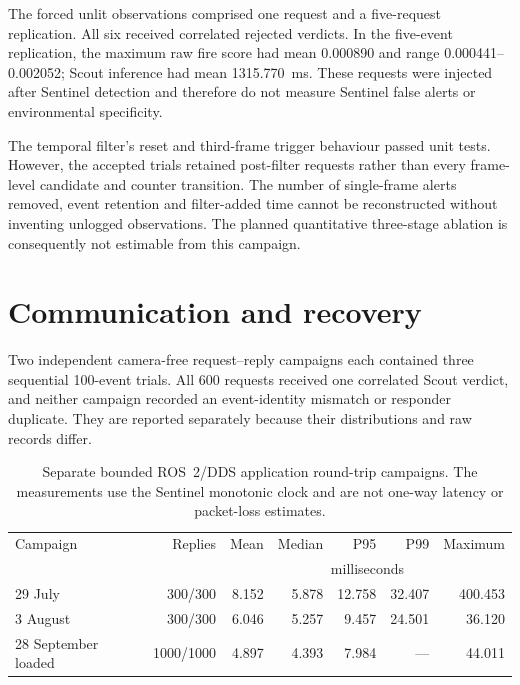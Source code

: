 The forced unlit observations comprised one request and a five-request
replication. All six received correlated rejected verdicts. In the five-event
replication, the maximum raw fire score had mean 0.000890 and range
0.000441--0.002052; Scout inference had mean 1315.770~ms. These requests were
injected after Sentinel detection and therefore do not measure Sentinel false
alerts or environmental specificity.

The temporal filter's reset and third-frame trigger behaviour passed unit
tests. However, the accepted trials retained post-filter requests rather than
every frame-level candidate and counter transition. The number of single-frame
alerts removed, event retention and filter-added time cannot be reconstructed
without inventing unlogged observations. The planned quantitative three-stage
ablation is consequently not estimable from this campaign.

\section{Communication and recovery}
\label{sec:results:5}

Two independent camera-free request--reply campaigns each contained three
sequential 100-event trials. All 600 requests received one correlated Scout
verdict, and neither campaign recorded an event-identity mismatch or responder
duplicate. They are reported separately because their distributions and raw
records differ.

\begin{table}[H]
  \centering
  \caption{Separate bounded ROS~2/DDS application round-trip campaigns. The
  measurements use the Sentinel monotonic clock and are not one-way latency or
  packet-loss estimates.}
  \label{tab:ros-rtt-results}
  \small
  \begin{tabular}{@{}lrrrrrr@{}}
    \toprule
    Campaign & Replies & Mean & Median & P95 & P99 & Maximum \\
     &  & \multicolumn{5}{c}{milliseconds} \\
    \midrule
    29 July & 300/300 & 8.152 & 5.878 & 12.758 & 32.407 & 400.453 \\
    3 August & 300/300 & 6.046 & 5.257 & 9.457 & 24.501 & 36.120 \\
    28 September loaded & 1000/1000 & 4.897 & 4.393 & 7.984 & --- & 44.011 \\
    \bottomrule
  \end{tabular}
\end{table}

